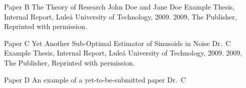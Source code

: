 \documentclass[12pt,a4paper,openright,final,twoside]{cseethesis}
\begin{document}

\makepaper
  {\paperheader}
  {\papertitle}
  {\paperauthorstring}
  {}
  {\copyrightstring}




\def\paperheader{Paper B}
\def\papertitle{The Theory of Research}
\def\paperauthorstring{John Doe and Jane Doe}
\def\referencestring{Example Thesis, Internal Report, Lule{\aa} University of Technology, 2009.}
\def\copyrightstring{2009, The Publisher, Reprinted with permission.}


\makepaperaccepted
  {\paperheader}
  {\papertitle}
  {\paperauthorstring}
  {\referencestring}
  {\copyrightstring}



\def\paperheader{Paper C}
\def\papertitle{Yet Another Sub-Optimal Estimator of Sinusoids in Noise}
\def\paperauthorstring{Dr.\ C}
\def\referencestring{Example Thesis, Internal Report, Lule{\aa} University of Technology, 2009.}
\def\copyrightstring{2009, The Publisher, Reprinted with permission.}


\makepapersubmitted
  {\paperheader}
  {\papertitle}
  {\paperauthorstring}
  {\referencestring}
  {\copyrightstring}



\def\paperheader{Paper D}
\def\papertitle{An example of a yet-to-be-submitted paper}
\def\paperauthorstring{Dr.\ C}


\makepapertobesubmitted
  {\paperheader}
  {\papertitle}
  {\paperauthorstring}




\printglossary[type=\acronymtype]
\end{document}

